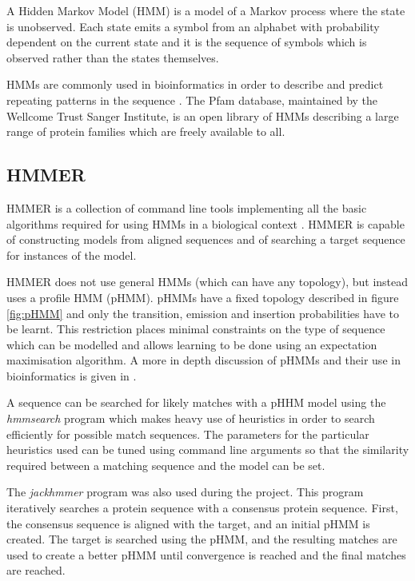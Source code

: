 A Hidden Markov Model (HMM) is a model of a Markov process where the state is
unobserved.
Each state emits a symbol from an alphabet with probability dependent on the 
current state and it is the sequence of symbols which is observed rather than
the states themselves. 

HMMs are commonly used in bioinformatics in order to describe and predict
repeating patterns in the sequence \citep{Durbin1998}.
The Pfam database, maintained by the Wellcome Trust Sanger Institute,
is an open library of HMMs describing a large range of protein families which
are freely available to all.

\subsection{HMMER}
\label{ssec:hmmer}

HMMER is a collection of command line tools implementing all the basic
algorithms required for using HMMs in a biological context \citep{HMMERguide}.
HMMER is capable of constructing models from aligned sequences and of searching
a target sequence for instances of the model.

HMMER does not use general HMMs (which can have any topology), but instead uses
a profile HMM (pHMM).
pHMMs have a fixed topology described in figure \ref{fig:pHMM} and only the 
transition, emission and insertion probabilities have to be learnt.
This restriction places minimal constraints on the type of sequence which can
be modelled and allows learning to be done using an expectation maximisation
algorithm. A more in depth discussion of pHMMs and their use in bioinformatics
is given in \citet{Durbin1998}.

A sequence can be searched for likely matches with a pHHM model using the 
\emph{hmmsearch} program which makes heavy use of heuristics in order to search 
efficiently for possible match sequences.
The parameters for the particular heuristics used can be tuned using command
line arguments so that the similarity required between a matching sequence 
and the model can be set.

The \emph{jackhmmer} program was also used during the project. 
This program iteratively searches a protein sequence with a consensus protein 
sequence.
First, the consensus sequence is aligned with the target, and an initial pHMM
is created.
The target is searched using the pHMM, and the resulting matches are used to 
create
a better pHMM until convergence is reached and the final matches are reached.

